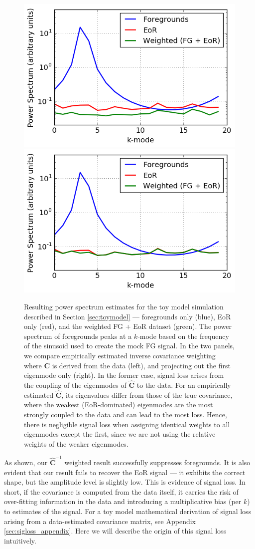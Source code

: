 \documentclass[preprint2,numberedappendix,tighten]{aastex6}  %
\begin{document}
\begin{figure}
	\centering
	\includegraphics[trim={0cm 0cm 0cm 0cm},clip,height=0.33\textwidth]{plots/toy_sigloss3.png}
	\includegraphics[trim={0cm 0cm 0cm 0cm},clip,height=0.33\textwidth]{plots/toy_sigloss4.png}
	\caption{Resulting power spectrum estimates for the toy model simulation described in Section \ref{sec:toymodel} --- 
foregrounds only (blue), EoR only (red), and the weighted FG + EoR dataset (green). The power spectrum of foregrounds peaks at a $k$-mode based on the frequency of the sinusoid used to create the mock FG signal. In the two panels, we compare empirically estimated inverse covariance weighting 
where $\textbf{C}$ is derived from the data (left), and projecting out the first eigenmode only (right). In the former 
case, signal loss arises from the coupling of the eigenmodes of $\widehat{\textbf{C}}$ to the data. For an empirically estimated $\widehat{\textbf{C}}$, its eigenvalues differ from those of the true covariance, where the weakest (EoR-dominated) eigenmodes are the most strongly coupled to the data and can lead to the most loss.
Hence, there is negligible signal loss when assigning identical weights to all eigenmodes except the first, since we are not using the relative weights of the weaker eigenmodes.}
	\label{fig:toy_sigloss3}
\end{figure}

As shown, our $\widehat{\textbf{C}}^{-1}$ weighted result successfully suppresses foregrounds. It is also evident that our result fails to 
recover the EoR signal --- it exhibits the correct shape, but the amplitude level is slightly low. This is evidence of signal loss. In short, if the covariance is computed from the data itself, it carries the risk of over-fitting information in the data and introducing a 
multiplicative bias (per $k$) to estimates of the signal. For a toy model mathematical derivation of signal loss arising from a data-estimated covariance matrix, see Appendix \ref{sec:sigloss_appendix}. Here we will describe the origin of this signal loss 
intuitively.
\end{document}
